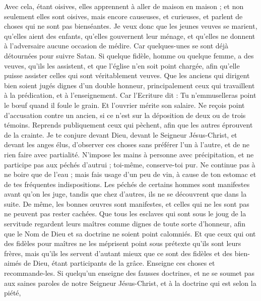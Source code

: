 \begin{multicols}{2}
Avec cela, étant oisives, elles apprennent à aller de maison en maison ; et non seulement elles sont oisives, mais encore causeuses, et curieuses, et parlent de choses qui ne sont pas bienséantes.
Je veux donc que les jeunes veuves se marient, qu'elles aient des enfants, qu'elles gouvernent leur ménage, et qu'elles ne donnent à l'adversaire aucune occasion de médire.
Car quelques-unes se sont déjà détournées pour suivre Satan.
Si quelque fidèle, homme ou quelque femme, a des veuves, qu'ils les assistent, et que l'église n'en soit point chargée, afin qu’elle puisse assister celles qui sont véritablement veuves.
Que les anciens qui dirigent bien soient jugés dignes d'un double honneur, principalement ceux qui travaillent à la prédication, et à l’enseignement.
Car l’Ecriture dit : Tu n’emmuselleras point le bœuf quand il foule le grain. Et l'ouvrier mérite son salaire.
Ne reçois point d'accusation contre un ancien, si ce n’est sur la déposition de deux ou de trois témoins.
Reprends publiquement ceux qui pèchent, afin que les autres éprouvent de la crainte.
Je te conjure devant Dieu, devant le Seigneur Jésus-Christ, et devant les anges élus, d’observer ces choses sans préférer l'un à l'autre, et de ne rien faire avec partialité.
N'impose les mains à personne avec précipitation, et ne participe pas aux péchés d'autrui ; toi-même, conserve-toi pur.
Ne continue pas à ne boire que de l’eau ; mais fais usage d’un peu de vin, à cause de ton estomac et de tes fréquentes indispositions.
Les péchés de certains hommes sont manifestes avant qu’on les juge, tandis que chez d’autres, ils ne se découvrent que dans la suite.
De même, les bonnes œuvres sont manifestes, et celles qui ne les sont pas ne peuvent pas rester cachées.
\VerseOne{}Que tous les esclaves qui sont sous le joug de la servitude regardent leurs maîtres comme dignes de toute sorte d'honneur, afin que le Nom de Dieu et sa doctrine ne soient point calomniés.
Et que ceux qui ont des fidèles pour maîtres ne les méprisent point sous prétexte qu'ils sont leurs frères, mais qu’ils les servent d’autant mieux que ce sont des fidèles et des bien-aimés de Dieu, étant participants de la grâce. Enseigne ces choses et recommande-les.
Si quelqu'un enseigne des fausses doctrines, et ne se soumet pas aux saines paroles de notre Seigneur Jésus-Christ, et à la doctrine qui est selon la piété,

\end{multicols}
